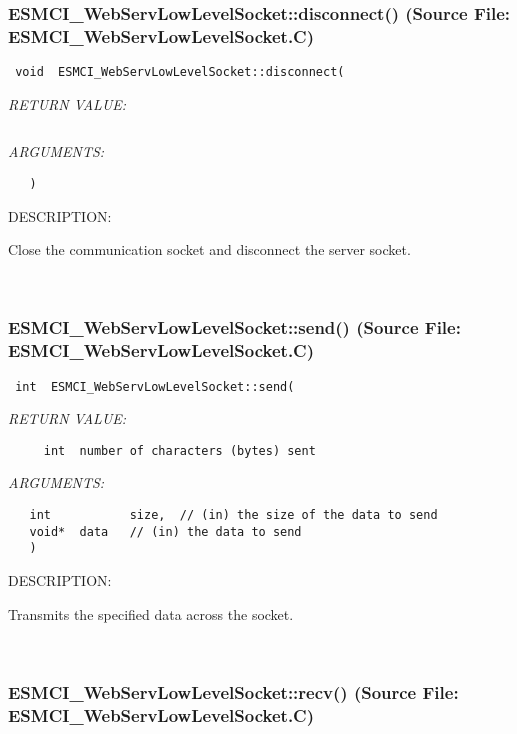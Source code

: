 \subsubsection{ESMCI\_WebServLowLevelSocket::disconnect() (Source File: ESMCI\_WebServLowLevelSocket.C)}


  
\begin{verbatim} void  ESMCI_WebServLowLevelSocket::disconnect(\end{verbatim}{\em RETURN VALUE:}
\begin{verbatim} \end{verbatim}{\em ARGUMENTS:}
\begin{verbatim}   )\end{verbatim}
{\sf DESCRIPTION:\\ }


      Close the communication socket and disconnect the server socket.
   
 
\mbox{}\hrulefill\
 
\subsubsection{ESMCI\_WebServLowLevelSocket::send() (Source File: ESMCI\_WebServLowLevelSocket.C)}


  
\begin{verbatim} int  ESMCI_WebServLowLevelSocket::send(\end{verbatim}{\em RETURN VALUE:}
\begin{verbatim}     int  number of characters (bytes) sent\end{verbatim}{\em ARGUMENTS:}
\begin{verbatim}   int           size,  // (in) the size of the data to send
   void*  data   // (in) the data to send
   )\end{verbatim}
{\sf DESCRIPTION:\\ }


      Transmits the specified data across the socket.
   
 
\mbox{}\hrulefill\
 
\subsubsection{ESMCI\_WebServLowLevelSocket::recv() (Source File: ESMCI\_WebServLowLevelSocket.C)}


